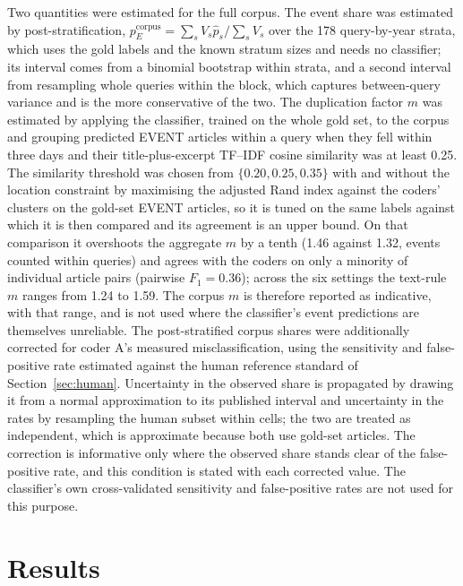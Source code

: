\documentclass[1p,times]{elsarticle}
\begin{document}
Two quantities were estimated for the full corpus. The event share was estimated by post-stratification, $p_E^{\mathrm{corpus}} = \sum_s V_s \hat p_s / \sum_s V_s$ over the 178 query-by-year strata, which uses the gold labels and the known stratum sizes and needs no classifier; its interval comes from a binomial bootstrap within strata, and a second interval from resampling whole queries within the block, which captures between-query variance and is the more conservative of the two. The duplication factor $m$ was estimated by applying the classifier, trained on the whole gold set, to the corpus and grouping predicted EVENT articles within a query when they fell within three days and their title-plus-excerpt TF--IDF cosine similarity was at least 0.25. The similarity threshold was chosen from $\{0.20, 0.25, 0.35\}$ with and without the location constraint by maximising the adjusted Rand index against the coders' clusters on the gold-set EVENT articles, so it is tuned on the same labels against which it is then compared and its agreement is an upper bound. On that comparison it overshoots the aggregate $m$ by a tenth (1.46 against 1.32, events counted within queries) and agrees with the coders on only a minority of individual article pairs (pairwise $F_1 = 0.36$); across the six settings the text-rule $m$ ranges from 1.24 to 1.59. The corpus $m$ is therefore reported as indicative, with that range, and is not used where the classifier's event predictions are themselves unreliable. The post-stratified corpus shares were additionally corrected for coder A's measured misclassification, using the sensitivity and false-positive rate estimated against the human reference standard of Section~\ref{sec:human}. Uncertainty in the observed share is propagated by drawing it from a normal approximation to its published interval and uncertainty in the rates by resampling the human subset within cells; the two are treated as independent, which is approximate because both use gold-set articles. The correction is informative only where the observed share stands clear of the false-positive rate, and this condition is stated with each corrected value. The classifier's own cross-validated sensitivity and false-positive rates are not used for this purpose.

\section{Results}
\label{sec:results}
\end{document}
